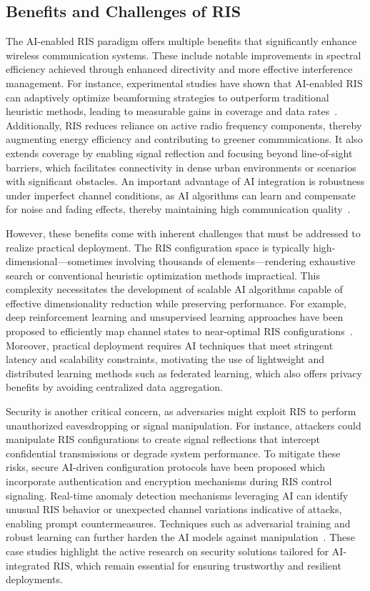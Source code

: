 \documentclass[sigconf]{acmart}
\begin{document}
\subsection{Benefits and Challenges of RIS}

The AI-enabled RIS paradigm offers multiple benefits that significantly enhance wireless communication systems. These include notable improvements in spectral efficiency achieved through enhanced directivity and more effective interference management. For instance, experimental studies have shown that AI-enabled RIS can adaptively optimize beamforming strategies to outperform traditional heuristic methods, leading to measurable gains in coverage and data rates~\cite{ref49}. Additionally, RIS reduces reliance on active radio frequency components, thereby augmenting energy efficiency and contributing to greener communications. It also extends coverage by enabling signal reflection and focusing beyond line-of-sight barriers, which facilitates connectivity in dense urban environments or scenarios with significant obstacles. An important advantage of AI integration is robustness under imperfect channel conditions, as AI algorithms can learn and compensate for noise and fading effects, thereby maintaining high communication quality~\cite{ref49}.

However, these benefits come with inherent challenges that must be addressed to realize practical deployment. The RIS configuration space is typically high-dimensional—sometimes involving thousands of elements—rendering exhaustive search or conventional heuristic optimization methods impractical. This complexity necessitates the development of scalable AI algorithms capable of effective dimensionality reduction while preserving performance. For example, deep reinforcement learning and unsupervised learning approaches have been proposed to efficiently map channel states to near-optimal RIS configurations~\cite{ref49}. Moreover, practical deployment requires AI techniques that meet stringent latency and scalability constraints, motivating the use of lightweight and distributed learning methods such as federated learning, which also offers privacy benefits by avoiding centralized data aggregation.

Security is another critical concern, as adversaries might exploit RIS to perform unauthorized eavesdropping or signal manipulation. For instance, attackers could manipulate RIS configurations to create signal reflections that intercept confidential transmissions or degrade system performance. To mitigate these risks, secure AI-driven configuration protocols have been proposed which incorporate authentication and encryption mechanisms during RIS control signaling. Real-time anomaly detection mechanisms leveraging AI can identify unusual RIS behavior or unexpected channel variations indicative of attacks, enabling prompt countermeasures. Techniques such as adversarial training and robust learning can further harden the AI models against manipulation~\cite{ref49}. These case studies highlight the active research on security solutions tailored for AI-integrated RIS, which remain essential for ensuring trustworthy and resilient deployments.
\end{document}
